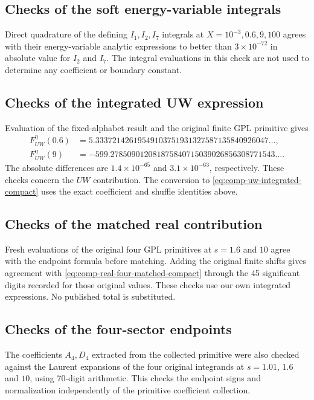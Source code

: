 \subsection{Checks of the soft energy-variable integrals}
Direct quadrature of the defining
$I_1,I_2,I_7$ integrals at $X=10^{-3},0.6,9,100$ agrees with their
energy-variable analytic expressions to better than $3\times10^{-72}$
in absolute value for $I_2$ and $I_7$. The integral evaluations in this
check are not used to determine any coefficient or boundary constant.

\subsection{Checks of the integrated UW expression}
Evaluation of the fixed-alphabet result and the original finite GPL primitive gives
\begin{align} F_{UW}^{\eta}(0.6)&=5.33372142619549103751931327587135840926047\ldots,\\
F_{UW}^{\eta}(9)&=-599.278509012081875840715039026856308771543\ldots.\end{align}
The absolute differences are $1.4\times10^{-65}$ and $3.1\times10^{-63}$, respectively. These checks concern the $UW$ contribution. The conversion to \eqref{eq:comp-uw-integrated-compact} uses the exact coefficient and shuffle identities above.

\subsection{Checks of the matched real contribution}
Fresh evaluations of the original four GPL primitives at $s=1.6$ and $10$ agree with the endpoint formula before matching. Adding the original finite shifts gives agreement with \eqref{eq:comp-real-four-matched-compact} through the 45 significant digits recorded for those original values. These checks use our own integrated expressions. No published total is substituted.

\subsection{Checks of the four-sector endpoints}
The coefficients $A_4,D_4$ extracted from the collected primitive were
also checked against the Laurent expansions of the four original
integrands at $s=1.01$, $1.6$ and $10$, using 70-digit arithmetic.
This checks the endpoint signs and normalization independently of the
primitive coefficient collection.

